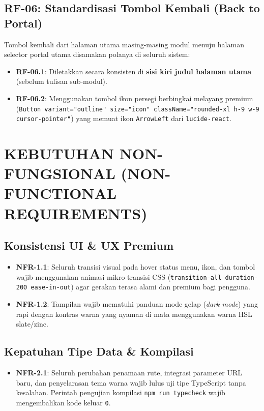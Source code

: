 \documentclass[11pt,a4paper]{article}
\begin{document}
\subsection{RF-06: Standardisasi Tombol Kembali (Back to Portal)}
Tombol kembali dari halaman utama masing-masing modul menuju halaman selector portal utama disamakan polanya di seluruh sistem:
\begin{itemize}
    \item \textbf{RF-06.1}: Diletakkan secara konsisten di \textbf{sisi kiri judul halaman utama} (sebelum tulisan sub-modul).
    \item \textbf{RF-06.2}: Menggunakan tombol ikon persegi berbingkai melayang premium (\texttt{Button variant="outline" size="icon" className="rounded-xl h-9 w-9 cursor-pointer"}) yang memuat ikon \texttt{ArrowLeft} dari \texttt{lucide-react}.
\end{itemize}

\newpage

\section{KEBUTUHAN NON-FUNGSIONAL (NON-FUNCTIONAL REQUIREMENTS)}

\subsection{Konsistensi UI \& UX Premium}
\begin{itemize}
    \item \textbf{NFR-1.1}: Seluruh transisi visual pada hover status menu, ikon, dan tombol wajib menggunakan animasi mikro transisi CSS (\texttt{transition-all duration-200 ease-in-out}) agar gerakan terasa alami dan premium bagi pengguna.
    \item \textbf{NFR-1.2}: Tampilan wajib mematuhi panduan mode gelap (\textit{dark mode}) yang rapi dengan kontras warna yang nyaman di mata menggunakan warna HSL slate/zinc.
\end{itemize}

\subsection{Kepatuhan Tipe Data \& Kompilasi}
\begin{itemize}
    \item \textbf{NFR-2.1}: Seluruh perubahan penamaan rute, integrasi parameter URL baru, dan penyelarasan tema warna wajib lulus uji tipe TypeScript tanpa kesalahan. Perintah pengujian kompilasi \texttt{npm run typecheck} wajib mengembalikan kode keluar \texttt{0}.
\end{itemize}
\end{document}
